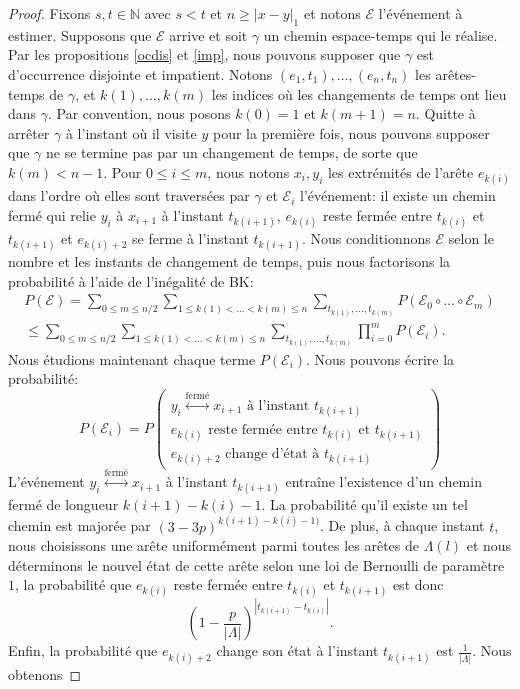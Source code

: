 \documentclass[titlepage,a4paper,12pt]{article}
\newcounter{d}
\newcounter{t}
\newcounter{p}
\newcounter{c}
\newcounter{a}
\newcounter{l}
\begin{document}
\begin{proof}
Fixons $s,t\in \mathbb{N}$ avec $s< t$ et $n\geqslant |x-y|_1$ et notons $\mathcal{E}$ l'événement à estimer. Supposons que $\mathcal{E}$ arrive et soit $\gamma$ un chemin espace-temps qui le réalise. Par les propositions \ref{ocdis} et \ref{imp}, nous pouvons supposer que $\gamma$ est d'occurrence disjointe et impatient. Notons $(e_1,t_1),\dots,(e_n,t_n)$ les arêtes-temps de $\gamma$, et $k(1),\dots,k(m)$ les indices où les changements de temps ont lieu dans $\gamma$. Par convention, nous posons $k(0) = 1$ et $k(m+1)=n$. Quitte à arrêter $\gamma$ à l'instant où il visite $y$ pour la première fois, nous pouvons supposer que $\gamma$ ne se termine pas par un changement de temps, de sorte que $k(m)< n-1$. Pour $0\leqslant i \leqslant m$, nous notons $x_i,y_i$ les extrémités de l'arête $e_{k(i)}$ dans l'ordre où elles sont traversées par $\gamma$ et $\mathcal{E}_i$ l'événement: il existe un chemin fermé qui relie $y_i$ à $x_{i+1}$  à l'instant $t_{k(i+1)}$, $e_{k(i)}$ reste fermée entre $t_{k(i)}$ et $t_{k(i+1)}$ et $e_{k(i)+2}$ se ferme à l'instant $t_{k(i+1)}$. Nous conditionnons $\mathcal{E}$ selon le nombre et les instants de changement de temps, puis nous factorisons la probabilité à l'aide de l'inégalité de BK:
\begin{multline*}
P(\mathcal{E})
= \sum_{0\leqslant m \leqslant n/2}\sum_{1\leqslant k(1)<\dots<k(m)\leqslant n}\sum_{t_{k(1)},\dots,t_{k(m)}}P(\mathcal{E}_0\circ\dots\circ \mathcal{E}_m)\\
\leqslant \sum_{0\leqslant m \leqslant n/2}\sum_{1\leqslant k(1)<\dots<k(m)\leqslant n}\sum_{t_{k(1)},\dots,t_{k(m)}} \prod_{i=0}^mP(\mathcal{E}_i).
\end{multline*}
Nous étudions maintenant chaque terme $P(\mathcal{E}_i)$. Nous pouvons écrire la probabilité:
$$
P(\mathcal{E}_i) = P\left(\begin{array}{c}
y_i\overset{\text{fermé}}{\longleftrightarrow} x_{i+1}\text{ à l'instant }t_{k(i+1)}\\
e_{k(i)} \text{ reste fermée entre } t_{k(i)} \text{ et } t_{k(i+1)}\\
e_{k(i)+2} \text{ change d'état à }t_{k(i+1)}
\end{array}\right)
$$
L'événement $y_i\overset{\text{fermé}}{\longleftrightarrow} x_{i+1}$ à l'instant $t_{k(i+1)}$ entraîne l'existence d'un chemin fermé de longueur $k(i+1)-k(i)-1$. La probabilité qu'il existe un tel chemin est majorée par $(3-3p)^{k(i+1)-k(i)-1)}$.
De plus, à chaque instant $t$, nous choisissons une arête uniformément parmi toutes les arêtes de $\Lambda(l)$ et nous déterminons le nouvel état de cette arête selon une loi de Bernoulli  de paramètre $1$, la probabilité que $e_{k(i)}$ reste fermée entre $t_{k(i)}$ et $t_{k(i+1)}$ est donc $$\left(1-\frac{p}{|\Lambda|}\right)^{|t_{k(i+1)}-t_{k(i)}|}.$$ Enfin, la probabilité que $e_{k(i)+2}$ change son état à l'instant $t_{k(i+1)}$ est $\frac{1}{|\Lambda|}$. Nous obtenons

\end{proof}
\end{document}
